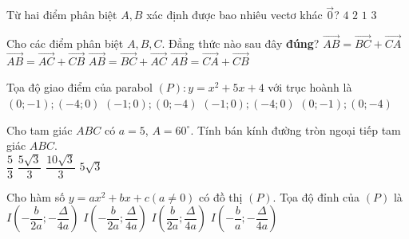 \begin{ex}%
Từ hai điểm phân biệt $A,B$ xác định được bao nhiêu vectơ khác $\overrightarrow{0}$?
\choice
{$4$}
{\True $2$}
{$1$}
{$3$}
\end{ex}
\begin{ex}%
Cho các điểm phân biệt $A,B,C$. Đẳng thức nào sau đây \textbf{đúng}?
\choice
{$\overrightarrow{AB}=\overrightarrow{BC}+\overrightarrow{CA}$}
{\True $\overrightarrow{AB}=\overrightarrow{AC}+\overrightarrow{CB}$}
{$\overrightarrow{AB}=\overrightarrow{BC}+\overrightarrow{AC}$}
{$\overrightarrow{AB}=\overrightarrow{CA}+\overrightarrow{CB}$}
\end{ex}
\begin{ex}%
Tọa độ giao điểm của parabol $(P)\colon y=x^2+5x+4$ với trục hoành là
\choice
{$(0;-1);(-4;0)$}
{$(-1;0);(0;-4)$}
{\True $(-1;0);(-4;0)$}
{$(0;-1);(0;-4)$}
\end{ex}
\begin{ex}%
Cho tam giác $ABC$ có $a=5$, $A=60^\circ$. Tính bán kính đường tròn ngoại tiếp tam giác $ABC$.\\
\choice
{$\dfrac{5}{3}$}
{\True $\dfrac{5\sqrt{3}}{3}$}
{$\dfrac{10\sqrt{3}}{3}$}
{$5\sqrt{3}$}
\end{ex}
\begin{ex}%
Cho hàm số $y=a x^2+b x+c(a\ne 0)$ có đồ thị $(P)$. Tọa độ đỉnh của $(P)$ là
\choice
{\True $I\left(-\dfrac{b}{2a};-\dfrac{\Delta}{4a}\right)$}
{$I\left(-\dfrac{b}{2a};\dfrac{\Delta}{4a}\right)$}
{$I\left(\dfrac{b}{2a};\dfrac{\Delta}{4a}\right)$}
{$I\left(-\dfrac{b}{a};-\dfrac{\Delta}{4a}\right)$}
\end{ex}
